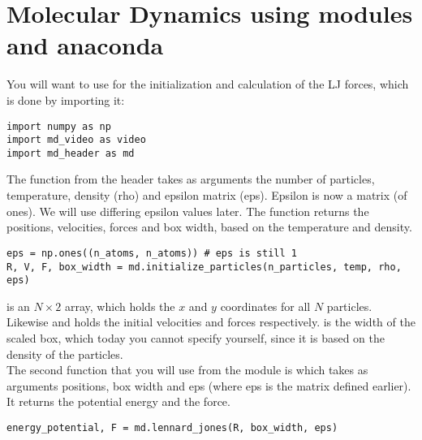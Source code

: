 \documentclass{article}
\begin{document}
\newpage


\section{Molecular Dynamics using modules and anaconda}

You will want to use  for the initialization and calculation of the LJ forces, which is done by importing it:

\begin{lstlisting}
import numpy as np
import md_video as video
import md_header as md
\end{lstlisting}

The  function from the header takes as arguments
the number of particles, temperature, density (rho) and epsilon matrix (eps).
Epsilon is now a matrix (of ones). We will use differing epsilon values later.
The function returns the positions, velocities, forces and box width, based on the temperature and density.

\begin{lstlisting}
eps = np.ones((n_atoms, n_atoms)) # eps is still 1
R, V, F, box_width = md.initialize_particles(n_particles, temp, rho, eps)
\end{lstlisting}

 is an $N\times2$ array, which holds the $x$ and $y$ coordinates for all $N$ particles.
Likewise  and  holds the initial velocities and forces respectively.
 is the width of the scaled box, which today you cannot specify yourself,
since it is based on the density of the particles.\\

The second function that you will use from the  module is  which takes as arguments positions, box width and eps (where eps is the matrix defined earlier).
It returns the potential energy and the force.

\begin{lstlisting}
energy_potential, F = md.lennard_jones(R, box_width, eps)
\end{lstlisting}
\end{document}
